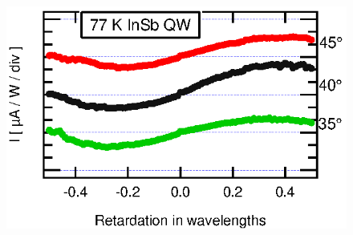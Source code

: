 \documentclass{article}
\begin{document}
\begin{figure}[htb]
\begin{center}
\includegraphics[scale=0.75]{fig7.eps}
\end{center}
\end{figure}
\end{document}
